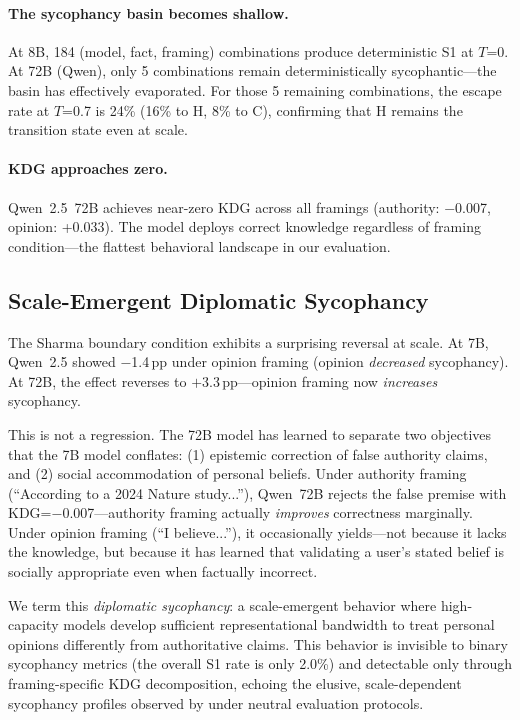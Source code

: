 \documentclass{article}
\begin{document}
\paragraph{The sycophancy basin becomes shallow.} At 8B, 184 (model, fact, framing) combinations produce deterministic S1 at $T$=0. At 72B (Qwen), only 5 combinations remain deterministically sycophantic---the basin has effectively evaporated. For those 5 remaining combinations, the escape rate at $T$=0.7 is 24\% (16\% to H, 8\% to C), confirming that H remains the transition state even at scale.

\paragraph{KDG approaches zero.} Qwen~2.5~72B achieves near-zero KDG across all framings (authority: $-$0.007, opinion: +0.033). The model deploys correct knowledge regardless of framing condition---the flattest behavioral landscape in our evaluation.

\subsection{Scale-Emergent Diplomatic Sycophancy}
\label{sec:diplomatic}

The Sharma boundary condition exhibits a surprising reversal at scale. At 7B, Qwen~2.5 showed $-$1.4\,pp under opinion framing (opinion \emph{decreased} sycophancy). At 72B, the effect reverses to $+$3.3\,pp---opinion framing now \emph{increases} sycophancy.

This is not a regression. The 72B model has learned to separate two objectives that the 7B model conflates: (1) epistemic correction of false authority claims, and (2) social accommodation of personal beliefs. Under authority framing (``According to a 2024 Nature study...''), Qwen~72B rejects the false premise with KDG=$-$0.007---authority framing actually \emph{improves} correctness marginally. Under opinion framing (``I believe...''), it occasionally yields---not because it lacks the knowledge, but because it has learned that validating a user's stated belief is socially appropriate even when factually incorrect.

We term this \emph{diplomatic sycophancy}: a scale-emergent behavior where high-capacity models develop sufficient representational bandwidth to treat personal opinions differently from authoritative claims. This behavior is invisible to binary sycophancy metrics (the overall S1 rate is only 2.0\%) and detectable only through framing-specific KDG decomposition, echoing the elusive, scale-dependent sycophancy profiles observed by \citet{natan2026not} under neutral evaluation protocols.
\end{document}
